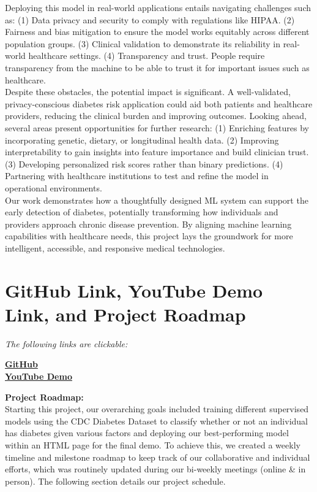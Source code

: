 \documentclass[conference]{IEEEtran}
\begin{document}
Deploying this model in real-world applications entails navigating challenges such as: (1) Data privacy and security to comply with regulations like HIPAA. (2) Fairness and bias mitigation to ensure the model works equitably across different population groups. (3) Clinical validation to demonstrate its reliability in real-world healthcare settings. (4) Transparency and trust. People require transparency from the machine to be able to trust it for important issues such as healthcare. \\

Despite these obstacles, the potential impact is significant. A well-validated, privacy-conscious diabetes risk application could aid both patients and healthcare providers, reducing the clinical burden and improving outcomes. Looking ahead, several areas present opportunities for further research: (1) Enriching features by incorporating genetic, dietary, or longitudinal health data. (2) Improving interpretability to gain insights into feature importance and build clinician trust. (3) Developing personalized risk scores rather than binary predictions. (4) Partnering with healthcare institutions to test and refine the model in operational environments.\\ 

Our work demonstrates how a thoughtfully designed ML system can support the early detection of diabetes, potentially transforming how individuals and providers approach chronic disease prevention. By aligning machine learning capabilities with healthcare needs, this project lays the groundwork for more intelligent, accessible, and responsive medical technologies.

\section{GitHub Link, YouTube Demo Link, and Project Roadmap}

\vspace{1em}
\noindent \textit{The following links are clickable:}
\begin{center}
\href{https://github.com/LJMurphyy/diabetes-risk-predictor.git}{\textbf{GitHub}}\\
\vspace{.5em}
\href{https://youtu.be/A3SVoX7vvxk?feature=shared}{\textbf{YouTube Demo}}
\end{center}

\noindent \textbf{Project Roadmap:}\\
Starting this project, our overarching goals included training different supervised models using the CDC Diabetes Dataset to classify whether or not an individual has diabetes given various factors and deploying our best-performing model within an HTML page for the final demo. To achieve this, we created a weekly timeline and milestone roadmap to keep track of our collaborative and individual efforts, which was routinely updated during our bi-weekly meetings (online \& in person). The following section details our project schedule.
\end{document}
